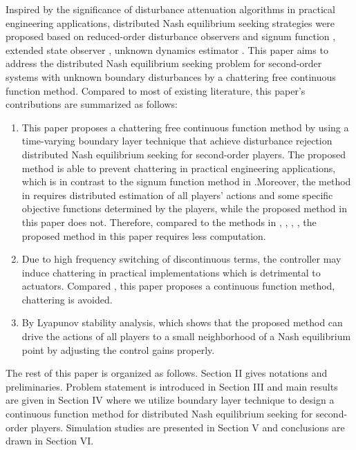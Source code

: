 \documentclass[lettersize,journal]{IEEEtran}
\begin{document}
Inspired by the significance of disturbance attenuation algorithms in practical engineering applications, distributed Nash equilibrium seeking strategies were proposed based on reduced-order disturbance observers and signum function \cite{9696299}, extended state observer \cite{ye2020distributed}, unknown dynamics estimator \cite{li2021distributed}.
This paper aims to address the distributed Nash equilibrium seeking problem for second-order systems with unknown boundary disturbances by a chattering free continuous function method. Compared to most of existing literature, this paper's contributions are summarized as follows:
\begin{enumerate}
    \item This paper proposes a chattering free continuous function method by using a time-varying boundary layer technique that achieve disturbance rejection distributed Nash equilibrium seeking for second-order players. The proposed method is able to prevent chattering in practical engineering applications, which is in contrast to the signum function method in \cite{9696299}.Moreover, the method in \cite{8985536} requires distributed estimation of all players' actions and some specific objective functions determined by the players, while the proposed method in this paper does not. Therefore, compared to the methods in \cite{9696299}, \cite{ye2020distributed}, \cite{li2021distributed}, \cite{8985536}, the proposed method in this paper requires less computation.
    \item Due to high frequency switching of discontinuous terms, the controller may induce chattering in practical implementations which is detrimental to actuators. Compared \cite{9696299}, this paper proposes a continuous function method, chattering is avoided.
    \item By Lyapunov stability analysis, which shows that the proposed method can drive the actions of all players to a small neighborhood of a Nash equilibrium point by adjusting the control gains properly.
\end{enumerate}

The rest of this paper is organized as follows. Section II gives notations and preliminaries. Problem statement is introduced in Section III and main results are given in Section IV where we utilize boundary layer technique to design a continuous function method for distributed Nash equilibrium seeking for second-order players. Simulation studies are presented in Section V and conclusions are drawn in Section VI.
\end{document}
